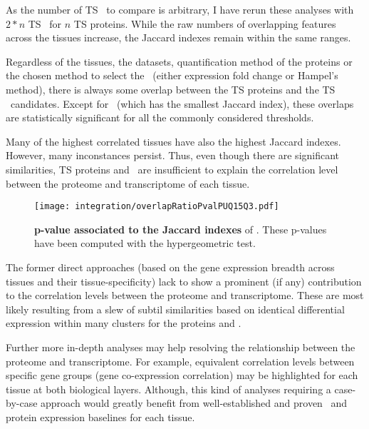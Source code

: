 As the number of \gls{TS} \mRNAs\ to compare is arbitrary,
I have rerun these analyses with $2*n$ \gls{TS} \mRNAs\ for $n$ \gls{TS} proteins.
While the raw numbers of overlapping features across the tissues increase,
the Jaccard indexes remain within the same ranges.

Regardless of the tissues, the datasets, quantification method of the proteins
or the chosen method to select the \mRNAs\
(either expression fold change or Hampel's method),
there is always some overlap between
the \gls{TS} proteins and the \gls{TS} \mRNAs\ candidates.
Except for \bladder\ (which has the smallest Jaccard index),
these overlaps are statistically significant
for all the commonly considered thresholds.

Many of the highest correlated tissues have also the highest Jaccard indexes.
However, many inconstances persist.
Thus, even though there are significant similarities,
\gls{TS} proteins and \mRNAs\ are insufficient to explain
the correlation level between the proteome and transcriptome of each tissue.

\begin{figure}[!htb]
    \texttt{[image: integration/overlapRatioPvalPUQ15Q3.pdf]}\centering
    \vspace{1mm}
    \caption[p-values associated to the Jaccard indexes]{\label{fig:JaccardPvalues}\label{fig:pJacquard}%
    \textbf{p-value associated to the Jaccard indexes} of \Cref{fig:JaccardIndexes}.
    These p-values have been computed with the hypergeometric test.}
\end{figure}

The former direct approaches
(based on the gene expression breadth across tissues and their tissue-specificity)
lack to show a prominent (if any) contribution to the correlation levels
between the proteome and transcriptome.
These are most likely resulting
from a slew of subtil similarities
based on identical differential expression
within many clusters for the proteins and \mRNAs{}.

Further more in-depth analyses may help resolving the relationship
between the proteome and transcriptome.
For example, equivalent correlation levels between specific gene groups
(gene co-expression correlation) may be highlighted
for each tissue at both biological layers.
Although, this kind of analyses requiring a case-by-case approach
would greatly benefit from
well-established and proven \mRNA\ and protein expression baselines
for each tissue.



